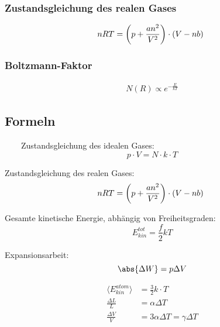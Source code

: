 \documentclass[11pt,letterpaper]{article}
\begin{document}
{{{    \subsubsection{Zustandsgleichung des realen Gases}
    {
        \begin{equation*}
            n R T = \left(p+\frac{a n^2}{V^2}\right) \cdot(V-n b)\\\
        \end{equation*}
    }
    \subsubsection{Boltzmann-Faktor}
    {
        \begin{align*}
            N(R) \propto  e^{-\frac{E}{kT}}
        \end{align*}
    }
}

 \subsection{Formeln}{
    \ \ \ \ Zustandsgleichung des idealen Gases:
    \begin{equation*}
        p\cdot V = N\cdot k\cdot T
    \end{equation*}

    Zustandsgleichung des realen Gases:
    \begin{equation*}
        n R T = \left(p+\frac{a n^2}{V^2}\right) \cdot(V-n b)\\\
    \end{equation*}

    Gesamte kinetische Energie, abhängig von Freiheitsgraden:
    \begin{equation*}
        E_{kin}^{tot} = \frac{f}{2} k T
    \end{equation*}

    Expansionsarbeit:
    \begin{equation*}
        \abs{\Delta W} = p\Delta V
    \end{equation*}

    \begin{align*}
        \langle E_{kin}^{atom}\rangle&=\frac{3}{2}k\cdot T \\
        \frac{\Delta L}{L}&=\alpha \Delta T\\
        \frac{\Delta V}{V} &= 3 \alpha \Delta T = \gamma \Delta T\\
    \end{align*}

}}}
\end{document}
